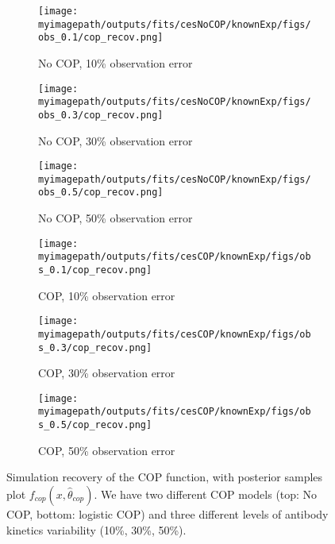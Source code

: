 \begin{figure}[H]

    \centering
    \begin{subfigure}{0.31\textwidth}
        \centering
        \texttt{[image: \\myimagepath/outputs/fits/cesNoCOP/knownExp/figs/obs\_0.1/cop\_recov.png]}
        \caption{No COP, 10\% observation error \label{fit1:copA}}
    \end{subfigure}
    \begin{subfigure}{0.31\textwidth}
        \centering
        \texttt{[image: \\myimagepath/outputs/fits/cesNoCOP/knownExp/figs/obs\_0.3/cop\_recov.png]}
        \caption{No COP, 30\% observation error \label{fit1:copB}}
    \end{subfigure}
    \begin{subfigure}{0.31\textwidth}
        \centering
        \texttt{[image: \\myimagepath/outputs/fits/cesNoCOP/knownExp/figs/obs\_0.5/cop\_recov.png]}
        \caption{No COP, 50\% observation error \label{fit1:copC}}
    \end{subfigure}
    
  \begin{subfigure}{0.31\textwidth}
        \centering
        \texttt{[image: \\myimagepath/outputs/fits/cesCOP/knownExp/figs/obs\_0.1/cop\_recov.png]}
        \caption{ COP, 10\% observation error \label{fit1:copD}}
    \end{subfigure}
    \begin{subfigure}{0.31\textwidth}
        \centering
        \texttt{[image: \\myimagepath/outputs/fits/cesCOP/knownExp/figs/obs\_0.3/cop\_recov.png]}
        \caption{ COP, 30\% observation error \label{fit1:copE}}
    \end{subfigure}
    \begin{subfigure}{0.31\textwidth}
        \centering
        \texttt{[image: \\myimagepath/outputs/fits/cesCOP/knownExp/figs/obs\_0.5/cop\_recov.png]}
        \caption{ COP, 50\% observation error \label{fit1:copF}}
    \end{subfigure}
    
    \caption{Simulation recovery of the COP function, with posterior samples plot  $f_{cop}(x, \hat{\theta}_{cop})$. We have two different COP models (top: No COP, bottom: logistic COP) and three different levels of antibody kinetics variability (10\%, 30\%, 50\%). \label{fit1:cop}}
    \end{figure}


